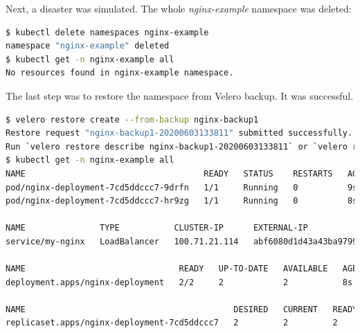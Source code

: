 Next, a disaster was simulated. The whole \textit{nginx-example} namespace was deleted:
\begin{lstlisting}[basicstyle=\tiny,caption={TODO},captionpos=b,language=Bash,xleftmargin=1cm]
$ kubectl delete namespaces nginx-example
namespace "nginx-example" deleted
$ kubectl get -n nginx-example all
No resources found in nginx-example namespace.
\end{lstlisting}

The last step was to restore the namespace from Velero backup. It was successful.
\begin{lstlisting}[basicstyle=\tiny,caption={TODO},captionpos=b,language=Bash,xleftmargin=1cm]
$ velero restore create --from-backup nginx-backup1
Restore request "nginx-backup1-20200603133811" submitted successfully.
Run `velero restore describe nginx-backup1-20200603133811` or `velero restore logs nginx-backup1-20200603133811` for more details.
$ kubectl get -n nginx-example all
NAME                                    READY   STATUS    RESTARTS   AGE
pod/nginx-deployment-7cd5ddccc7-9drfn   1/1     Running   0          9s
pod/nginx-deployment-7cd5ddccc7-hr9zg   1/1     Running   0          8s

NAME               TYPE           CLUSTER-IP      EXTERNAL-IP                                                               PORT(S)        AGE
service/my-nginx   LoadBalancer   100.71.21.114   abf6080d1d43a43ba97999bb6b22cabc-2114878664.eu-west-1.elb.amazonaws.com   80:32539/TCP   8s

NAME                               READY   UP-TO-DATE   AVAILABLE   AGE
deployment.apps/nginx-deployment   2/2     2            2           8s

NAME                                          DESIRED   CURRENT   READY   AGE
replicaset.apps/nginx-deployment-7cd5ddccc7   2         2         2       8s
\end{lstlisting}


